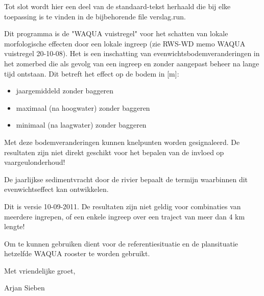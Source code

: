 Tot slot wordt hier een deel van de standaard-tekst herhaald die bij elke toepassing is te vinden in de bijbehorende file verslag.run.

Dit programma is de "WAQUA vuistregel" voor het schatten van lokale morfologische effecten door een lokale ingreep (zie RWS-WD memo WAQUA vuistregel 20-10-08).
Het is een inschatting van evenwichtsbodemveranderingen in het zomerbed die als gevolg van een ingreep en zonder aangepast beheer na lange tijd ontstaan.
Dit betreft het effect op de bodem in [m]:

\begin{itemize}
\item jaargemiddeld zonder baggeren
\item maximaal (na hoogwater) zonder baggeren
\item minimaal (na laagwater) zonder baggeren
\end{itemize}

Met deze bodemveranderingen kunnen knelpunten worden gesignaleerd.
De resultaten zijn niet direkt geschikt voor het bepalen van de invloed op vaargeulonderhoud!

De jaarlijkse sedimentvracht door de rivier bepaalt de termijn waarbinnen dit evenwichtseffect kan ontwikkelen.

Dit is versie 10-09-2011.
De resultaten zijn niet geldig voor combinaties van meerdere ingrepen, of een enkele ingreep over een traject van meer dan 4 km lengte!

Om \dfastmi te kunnen gebruiken dient voor de referentiesituatie en de plansituatie hetzelfde WAQUA rooster te worden gebruikt.

Met vriendelijke groet,

Arjan Sieben